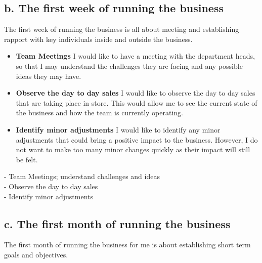 \documentclass{article}
\begin{document}
\subsection{b. The first week of running the business}
The first week of running the business is all about meeting and establishing rapport with key individuals inside and outside the business. \\

\begin{itemize}
    \item \textbf{Team Meetings} I would like to have a meeting with the department heads, so that I may understand the challenges they are facing and any possible ideas they may have. \\
    \item \textbf{Observe the day to day sales} I would like to observe the day to day sales that are taking place in store. This would allow me to see the current state of the business and how the team is currently operating. \\
    \item \textbf{Identify minor adjustments} I would like to identify any minor adjustments that could bring a positive impact to the business. However, I do not want to make too many minor changes quickly as their impact will still be felt. \\
\end{itemize}
- Team Meetings; understand challenges and ideas \\
- Observe the day to day sales \\
- Identify minor adjustments \\

\subsection{c. The first month of running the business}
The first month of running the business for me is about establishing short term goals and objectives. \\
\end{document}
